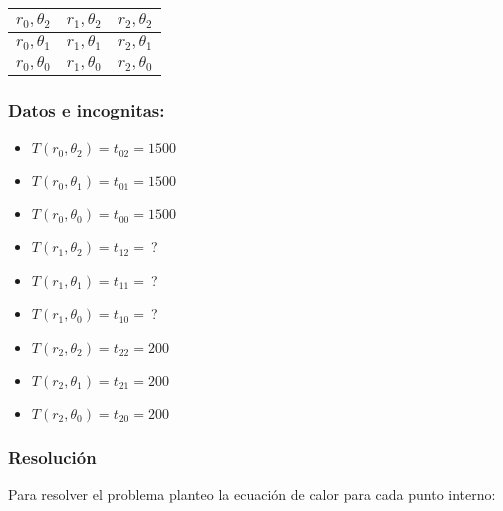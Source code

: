 \documentclass{article}
\begin{document}
\begin{center}
    \begin{tabular}{ |c|c|c| }
        \hline
        $r_0,\theta_2$ & $r_1,\theta_2$ & $r_2,\theta_2$ \\
        \hline
        $r_0,\theta_1$ & $r_1,\theta_1$ & $r_2,\theta_1$ \\
        \hline
        $r_0,\theta_0$ & $r_1,\theta_0$ & $r_2,\theta_0$ \\
        \hline
    \end{tabular}
\end{center}

\subsubsection*{Datos e incognitas:}

\begin{multicols}{3}
    \begin{itemize}
        \item[] $T(r_0,\theta_2) = t_{02} = 1500$
        \item[] $T(r_0,\theta_1) = t_{01} = 1500$
        \item[] $T(r_0,\theta_0) = t_{00} = 1500$
    \end{itemize}

    \begin{itemize}
        \item[] $T(r_1,\theta_2) = t_{12} =~$?
        \item[] $T(r_1,\theta_1) = t_{11} =~$?
        \item[] $T(r_1,\theta_0) = t_{10} =~$?
    \end{itemize}

    \begin{itemize}
        \item[] $T(r_2,\theta_2) = t_{22} = 200$
        \item[] $T(r_2,\theta_1) = t_{21} = 200$
        \item[] $T(r_2,\theta_0) = t_{20} = 200$
    \end{itemize}
\end{multicols}

\subsubsection*{Resolución}

Para resolver el problema planteo la ecuación de calor para cada punto interno:
\end{document}

